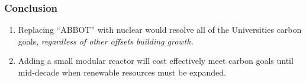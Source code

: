 \begin{frame}
  \frametitle{Conclusion}
  \begin{enumerate}
    \item Replacing ``ABBOT'' with nuclear would resolve all of the Universities
    carbon goals, \textit{regardless of other offsets building growth.}
    \item Adding a small modular reactor will cost effectively meet carbon goals
    until mid-decade when renewable resources must be expanded.
  \end{enumerate}
\end{frame}
